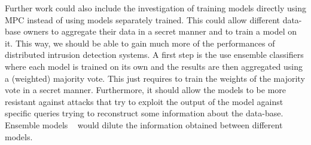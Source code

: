Further work could also include the investigation of training models directly using MPC instead of using models separately trained. This could allow different data-base owners to aggregate their data in a secret manner and to train a model on it. This way, we should be able to gain much more of the performances of distributed intrusion detection systems. A first step is the use ensemble classifiers where each model is trained on its own and the results are then aggregated using a (weighted) majority vote. This just requires to train the weights of the majority vote in a secret manner. Furthermore, it should allow the models to be more resistant against attacks that try to exploit the output of the model against specific queries trying to reconstruct some information about the data-base. Ensemble models ~\cite{Aburomman2017AClassifiers} would dilute the information obtained between different models.

